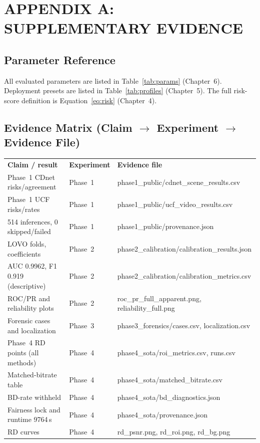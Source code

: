 \chapter{APPENDIX A: SUPPLEMENTARY EVIDENCE}

\section{Parameter Reference}

All evaluated parameters are listed in Table~\ref{tab:params} (Chapter~6). Deployment presets are listed in Table~\ref{tab:profiles} (Chapter~5). The full risk-score definition is Equation~\ref{eq:risk} (Chapter~4).

\section{Evidence Matrix (Claim $\rightarrow$ Experiment $\rightarrow$ Evidence File)}

\begin{longtable}{@{}lll@{}}
\textbf{Claim / result} & \textbf{Experiment} & \textbf{Evidence file} \\
Phase~1 CDnet risks/agreement & Phase~1 & phase1\_public/cdnet\_scene\_results.csv \\
Phase~1 UCF risks/rates & Phase~1 & phase1\_public/ucf\_video\_results.csv \\
514 inferences, 0 skipped/failed & Phase~1 & phase1\_public/provenance.json \\
LOVO folds, coefficients & Phase~2 & phase2\_calibration/calibration\_results.json \\
AUC 0.9962, F1 0.919 (descriptive) & Phase~2 & phase2\_calibration/calibration\_metrics.csv \\
ROC/PR and reliability plots & Phase~2 & roc\_pr\_full\_apparent.png, reliability\_full.png \\
Forensic cases and localization & Phase~3 & phase3\_forensics/cases.csv, localization.csv \\
Phase~4 RD points (all methods) & Phase~4 & phase4\_sota/roi\_metrics.csv, runs.csv \\
Matched-bitrate table & Phase~4 & phase4\_sota/matched\_bitrate.csv \\
BD-rate withheld & Phase~4 & phase4\_sota/bd\_diagnostics.json \\
Fairness lock and runtime 9764\,s & Phase~4 & phase4\_sota/provenance.json \\
RD curves & Phase~4 & rd\_psnr.png, rd\_roi.png, rd\_bg.png \\
\end{longtable}

